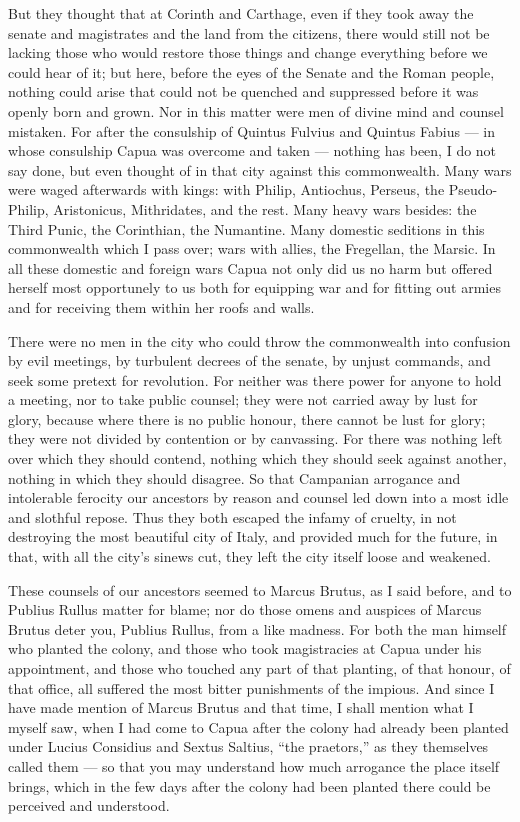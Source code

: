  But they thought that at Corinth and Carthage, even if they took away the senate and magistrates and the land from the citizens, there would still not be lacking those who would restore those things and change everything before we could hear of it; but here, before the eyes of the Senate and the Roman people, nothing could arise that could not be quenched and suppressed before it was openly born and grown. Nor in this matter were men of divine mind and counsel mistaken. For after the consulship of Quintus Fulvius and Quintus Fabius --- in whose consulship Capua was overcome and taken --- nothing has been, I do not say done, but even thought of in that city against this commonwealth. Many wars were waged afterwards with kings: with Philip, Antiochus, Perseus, the Pseudo-Philip, Aristonicus, Mithridates, and the rest. Many heavy wars besides: the Third Punic, the Corinthian, the Numantine. Many domestic seditions in this commonwealth which I pass over; wars with allies, the Fregellan, the Marsic. In all these domestic and foreign wars Capua not only did us no harm but offered herself most opportunely to us both for equipping war and for fitting out armies and for receiving them within her roofs and walls.

 There were no men in the city who could throw the commonwealth into confusion by evil meetings, by turbulent decrees of the senate, by unjust commands, and seek some pretext for revolution. For neither was there power for anyone to hold a meeting, nor to take public counsel; they were not carried away by lust for glory, because where there is no public honour, there cannot be lust for glory; they were not divided by contention or by canvassing. For there was nothing left over which they should contend, nothing which they should seek against another, nothing in which they should disagree. So that Campanian arrogance and intolerable ferocity our ancestors by reason and counsel led down into a most idle and slothful repose. Thus they both escaped the infamy of cruelty, in not destroying the most beautiful city of Italy, and provided much for the future, in that, with all the city's sinews cut, they left the city itself loose and weakened.

 These counsels of our ancestors seemed to Marcus Brutus, as I said before, and to Publius Rullus matter for blame; nor do those omens and auspices of Marcus Brutus deter you, Publius Rullus, from a like madness. For both the man himself who planted the colony, and those who took magistracies at Capua under his appointment, and those who touched any part of that planting, of that honour, of that office, all suffered the most bitter punishments of the impious. And since I have made mention of Marcus Brutus and that time, I shall mention what I myself saw, when I had come to Capua after the colony had already been planted under Lucius Considius and Sextus Saltius, ``the praetors,'' as they themselves called them --- so that you may understand how much arrogance the place itself brings, which in the few days after the colony had been planted there could be perceived and understood.

